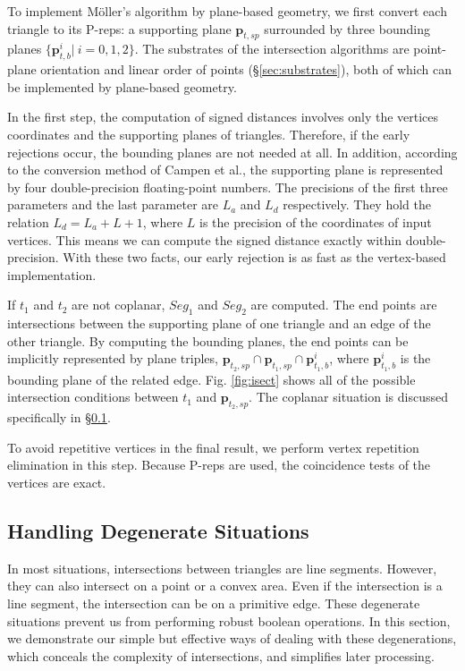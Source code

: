 To implement M\"{o}ller's algorithm by plane-based geometry, we first convert each triangle to its P-reps: a supporting plane $\bm{p}_{t, sp}$  surrounded by three bounding planes $\{\bm{p}_{t, b}^i|\ i = 0,1,2\}$. The substrates of the intersection algorithms are point-plane orientation \cite{bernstein2009fast} and linear order of points (\S\ref{sec:substrates}), both of which can be implemented by plane-based geometry.

In the first step, the computation of signed distances involves only the vertices coordinates and the supporting planes of triangles. Therefore, if the early rejections occur, the bounding planes are not needed at all. In addition, according to the conversion method of Campen et al.\cite{campen2010exact}, the supporting plane is represented by four double-precision floating-point numbers. The precisions of the first three parameters and the last parameter are $L_a$ and $L_d$ respectively. They hold the relation $L_d = L_a + L + 1$, where $L$ is the precision of the coordinates of input vertices. This means we can compute the signed distance exactly within double-precision. With these two facts, our early rejection is as fast as the vertex-based implementation.

If $t_1$ and $t_2$ are not coplanar, $Seg_1$ and $Seg_2$ are computed. The end points are intersections between the supporting plane of one triangle and an edge of the other triangle. By computing the bounding planes, the end points can be implicitly represented by plane triples, $\bm{p}_{t_2, sp} \cap \bm{p}_{t_1, sp} \cap \bm{p}^i_{t_1, b}$, where $\bm{p}^i_{t_1, b}$ is the bounding plane of the related edge.
Fig. \ref{fig:isect} shows all of the possible intersection conditions between $t_1$ and $\bm{p}_{t_2, sp}$. The coplanar situation is discussed specifically in \S \ref{sec:degenerate}.

To avoid repetitive vertices in the final result, we perform vertex repetition elimination in this step. Because P-reps are used, the coincidence tests of the vertices are exact.



\subsection{Handling Degenerate Situations }
\label{sec:degenerate}

In most situations, intersections between triangles are line segments. However, they can also intersect on a point or a convex area. Even if the intersection is a line segment, the intersection can be on a primitive edge. These degenerate situations prevent us from performing robust boolean operations. In this section, we demonstrate our simple but effective ways of dealing with these degenerations, which conceals the complexity of intersections, and simplifies later processing.


